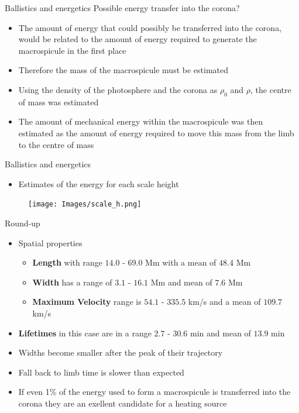 \documentclass{beamer}
\begin{document}
	\begin{frame}{Ballistics and energetics}
		Possible energy transfer into the corona?
		\begin{itemize}
			\item{The amount of energy that could possibly be transferred into the corona, would be related to the amount of energy required to generate the macrospicule in the first place}
			\item{Therefore the mass of the macrospicule must be estimated}
			\item{Using the density of the photosphere and the corona as $\rho_0$ and $\rho$, the centre of mass was estimated}
			\item{The amount of mechanical energy within the macrospicule was then estimated as the amount of energy required to move this mass from the limb to the centre of mass}
		\end{itemize}
	\end{frame}	
	
	\begin{frame}{Ballistics and energetics}
		\begin{itemize}
			\item{Estimates of the energy for each scale height}
		\end{itemize}
		\begin{figure}
			\centering	
				\texttt{[image: Images/scale\_h.png]}
		\end{figure}
	\end{frame}


	\begin{frame}{Round-up}
			\begin{itemize}
				\item Spatial properties
				\begin{itemize}
					\item \textbf{Length} with range $14.0$ - $69.0$ Mm with a mean of $48.4$ Mm
					\item \textbf{Width} has a range of $3.1$ - $16.1$ Mm and mean of $7.6$ Mm
					\item \textbf{Maximum Velocity} range is $54.1$ - $335.5$ km/s and a mean of $109.7$ km/s 
				\end{itemize}
				\item \textbf{Lifetimes} in this case are in a range $2.7$ - $30.6$ min and mean of $13.9$ min
				\item{Widths become smaller after the peak of their trajectory}
				\item{Fall back to limb time is slower than expected}
				\item{If even 1\% of the energy used to form a macrospicule is transferred into the corona they are an exellent candidate for a heating source}
	
			\end{itemize}
	\end{frame}
	
\end{document}
